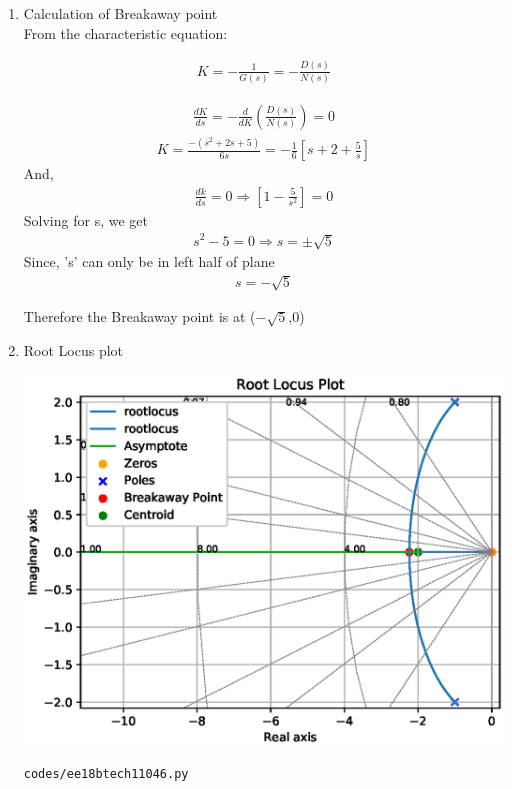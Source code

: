 \begin{enumerate}[label=\thesection.\arabic*.,ref=\thesection.\theenumi]
\item Calculation of Breakaway point \\

From the characteristic equation:
    
    \begin{align}
        K=-\frac{1}{G(s)}=-\frac{D(s)}{N(s)}    
    \end{align}

    \begin{align}
        \frac{d K}{d s}=-\frac{d}{d K}\left(\frac{D(s)}{N(s)}\right)=0    
    \end{align}
    \begin{align}
        K=\frac{-\left(s^{2}+2 s+5\right)}{6 s}=-\frac{1}{6}\left[s+2+\frac{5}{s}\right]    
    \end{align}
    And,
    \begin{align}
        \frac{d k}{d s}=0 \Rightarrow\left[1-\frac{5}{s^{2}}\right]=0 
    \end{align}
    Solving for s, we get
    \begin{align}
        s^{2}-5=0 \Rightarrow s=\pm \sqrt{5}    
    \end{align}
    Since, 's' can only be in left half of plane
    \begin{align}
        \boxed{s=-\sqrt{5}}    
    \end{align}
    
    Therefore the Breakaway point is at ($-\sqrt{5}$,0)

    
\item Root Locus plot

	\includegraphics[width=\columnwidth]{./figs/ee18btech11046.eps}

\begin{lstlisting}
codes/ee18btech11046.py
\end{lstlisting}    

\end{enumerate}
